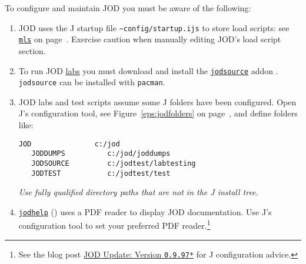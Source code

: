 To configure and maintain JOD you must be aware of the following:
\begin{enumerate}
	\item JOD uses the J startup file \verb|~config/startup.ijs| to store load scripts: see 
	\hyperlink{il:mls}{\texttt{mls}} on page~\pageref{ss:mls}.  Exercise caution when manually
	editing JOD's load script section.
	\item To run JOD \href{https://code.jsoftware.com/wiki/Labs/Migration}{labs} you must download and install the
	 \href{https://www.jsoftware.com/jwiki/Addons/general/jodsource}{\texttt{jodsource}} addon \cite{baker:jodsource}. 
	 \texttt{jodsource} can be installed with \texttt{pacman}.
	\item JOD labs and test scripts assume some J folders have been configured.  Open J's
	configuration tool, see Figure~\ref{eps:jodfolders} on 
   page~\pageref{eps:jodfolders}, and
	define folders like:
	\begin{lstlisting}[frame=single,framerule=0pt,label=lst:foldercfg]
   JOD               c:/jod
   JODDUMPS          c:/jod/joddumps
   JODSOURCE         c:/jodtest/labtesting
   JODTEST           c:/jodtest/test
  \end{lstlisting}
  \emph{Use fully qualified directory paths that are not in the J install tree.}
  \item \hyperlink{il:jodhelp}{\texttt{jodhelp}} (\pageref{ss:jodhelp}) uses a 
  PDF reader to display JOD documentation. Use J's configuration tool to set 
  your preferred PDF reader.\footnote{See the blog post \href{https://bakerjd99.wordpress.com/2015/03/22/jod-update-version-0-9-97/}{JOD Update: Version \texttt{0.9.97*}} for J configuration advice.
  } 
\end{enumerate} 



